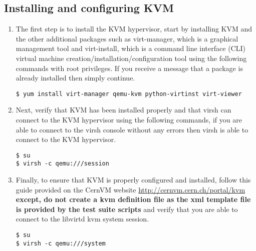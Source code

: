 \subsection{Installing and configuring KVM}
\label{sec:rhkvm}
\begin{enumerate}
\item	The first step is to install the KVM hypervisor, start by installing KVM and the other additional packages such
		as virt-manager, which is a graphical management tool and virt-install, which is a command line interface (CLI)
		virtual machine creation/installation/configuration tool using the following commands with root privileges. If
		you receive a message that a package is already installed then simply continue.

\lstset{language=bash,caption=Installing KVM and Other Related Programs}
\begin{lstlisting}
$ yum install virt-manager qemu-kvm python-virtinst virt-viewer
\end{lstlisting}

\item	Next, verify that KVM has been installed properly and that virsh can connect to the KVM hypervisor using the
		following commands, if you are able to connect to the virsh console without any errors then virsh is able
		to connect to the KVM hypervisor.

\lstset{language=bash,caption=Verify that virsh can Access KVM}
\begin{lstlisting}
$ su
$ virsh -c qemu:///session
\end{lstlisting}

\item 	Finally, to ensure that KVM is properly configured and installed, follow this guide provided on the CernVM website
		\url{http://cernvm.cern.ch/portal/kvm} {\bf except, do not create a kvm definition file as the xml template file
		is provided by the test suite scripts} and verify that you are able to connect to the libvirtd kvm system session.
		
\lstset{language=bash,caption=Verify that KVM is Properly Configured}
\begin{lstlisting}
$ su
$ virsh -c qemu:///system 
\end{lstlisting}
\end{enumerate}




